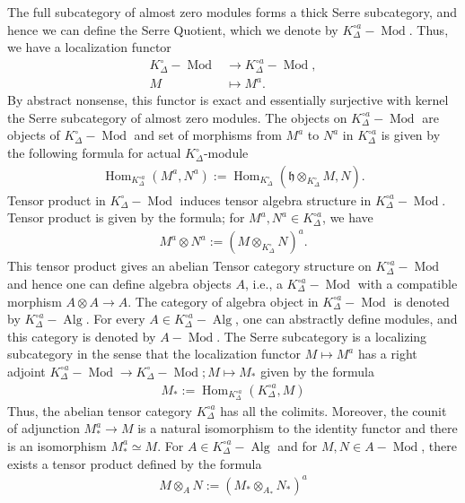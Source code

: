 \documentclass[12pts,a4paper]{amsart}
\DeclareMathOperator{\Hom}{Hom}
\DeclareMathOperator{\Mod}{Mod}
\DeclareMathOperator{\Alg}{Alg}
\begin{document}
The full subcategory of almost zero modules forms a thick Serre subcategory, and hence we can define the Serre Quotient, which we denote by $K^{\circ a}_\Delta-\Mod$. Thus, we have a localization functor
\begin{align*}
   K^\circ_\Delta-\Mod&\to K^{\circ a}_\Delta-\Mod,\\
                	              M&\mapsto M^a.
\end{align*}
By abstract nonsense, this functor is exact and essentially surjective with kernel the Serre subcategory of almost zero modules. The objects on $K^{\circ a}_\Delta-\Mod$ are objects of $K^\circ_\Delta-\Mod$ and set of morphisms from $M^a$ to $N^a$ in $K^{\circ a}_\Delta$ is given by the following formula for actual $K^\circ_\Delta$-module
\begin{align*}
	\Hom_{K^{\circ a}_\Delta}(M^a, N^a) := \Hom_{K^\circ_\Delta}(\mathfrak{h} \otimes_{K^\circ_\Delta} M, N).
\end{align*}
Tensor product in $K^\circ_\Delta-\Mod$ induces tensor algebra structure in $K^{\circ a}_\Delta-\Mod$. Tensor product is given by the formula; for $M^a,N^a\in K^{\circ a}_\Delta$, we have
\begin{align*}
    M^a\otimes N^a:=(M\otimes_{K^\circ_\Delta} N)^a.
\end{align*}
This tensor product gives an abelian Tensor category structure on $K^{\circ a}_\Delta-\Mod$ and hence one can define algebra objects $A$, i.e., a $K^{\circ a}_\Delta-\Mod$ with a compatible morphism $A\otimes A\to A$. The category of algebra object in $K^{\circ a}_\Delta-\Mod$ is denoted by $K^{\circ a}_\Delta-\Alg$. For every $A\in K^{\circ a}_\Delta-\Alg$, one can abstractly define modules, and this category is denoted by $A-\Mod$. The Serre subcategory is a localizing subcategory in the sense that the localization functor $M\mapsto M^a$ has a right adjoint $K^{\circ a}_\Delta-\Mod\to K^\circ_\Delta-\Mod; M\mapsto M_*$ given by the formula
\begin{align*}
    M_*:=\Hom_{K^{\circ a}_\Delta}(K^{\circ a}_\Delta,M)
\end{align*}
Thus, the abelian tensor category $K^{\circ a}_\Delta$ has all the colimits. Moreover, the counit of adjunction $M^a_*\to M$ is a natural isomorphism to the identity functor and there is an isomorphism $M^a_*\simeq M$. For $A\in K^{\circ a}_\Delta-\Alg$ and for $M,N\in A-\Mod$, there exists a tensor product defined by the formula
\begin{align*}
    M\otimes_A N:=(M_*\otimes_{A_*}N_*)^a
\end{align*}
\end{document}
